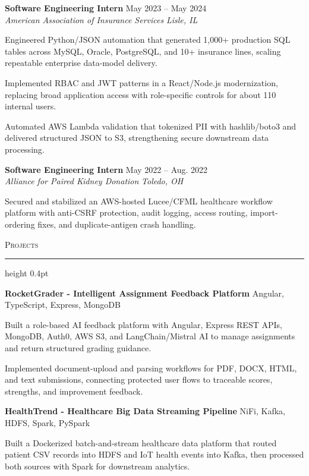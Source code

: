 \documentclass[letterpaper,11pt]{article}
\newcommand{\resumesection}[1]{%
  \par\vspace{2pt}%
  {\large\scshape #1}\par\vspace{2pt}%
  \hrule height 0.4pt\vspace{2pt}%
}
\newcommand{\resumeSubheading}[4]{
  \textbf{#1} \hfill #2\\
  \textit{#3} \hfill \textit{#4}
}
\newcommand{\projectHeading}[2]{
  \textbf{#1} \hfill #2
}
\begin{document}
\resumeSubheading
{Software Engineering Intern}{May 2023 -- May 2024}
{American Association of Insurance Services}{Lisle, IL}
\begin{tightitemize}
  \item Engineered Python/JSON automation that generated 1,000+ production SQL tables across MySQL, Oracle, PostgreSQL, and 10+ insurance lines, scaling repeatable enterprise data-model delivery.
  \item Implemented RBAC and JWT patterns in a React/Node.js modernization, replacing broad application access with role-specific controls for about 110 internal users.
  \item Automated AWS Lambda validation that tokenized PII with hashlib/boto3 and delivered structured JSON to S3, strengthening secure downstream data processing.
\end{tightitemize}

\resumeSubheading
{Software Engineering Intern}{May 2022 -- Aug. 2022}
{Alliance for Paired Kidney Donation}{Toledo, OH}
\begin{tightitemize}
  \item Secured and stabilized an AWS-hosted Lucee/CFML healthcare workflow platform with anti-CSRF protection, audit logging, access routing, import-ordering fixes, and duplicate-antigen crash handling.
\end{tightitemize}

\resumesection{Projects}
\projectHeading{RocketGrader - Intelligent Assignment Feedback Platform}{Angular, TypeScript, Express, MongoDB}
\begin{tightitemize}
  \item Built a role-based AI feedback platform with Angular, Express REST APIs, MongoDB, Auth0, AWS S3, and LangChain/Mistral AI to manage assignments and return structured grading guidance.
  \item Implemented document-upload and parsing workflows for PDF, DOCX, HTML, and text submissions, connecting protected user flows to traceable scores, strengths, and improvement feedback.
\end{tightitemize}

\projectHeading{HealthTrend - Healthcare Big Data Streaming Pipeline}{NiFi, Kafka, HDFS, Spark, PySpark}
\begin{tightitemize}
  \item Built a Dockerized batch-and-stream healthcare data platform that routed patient CSV records into HDFS and IoT health events into Kafka, then processed both sources with Spark for downstream analytics.
\end{tightitemize}
\end{document}
